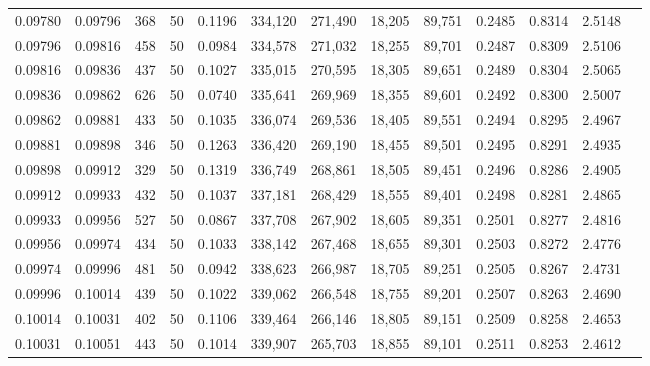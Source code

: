 \begin{tabular}{rrrrrrrrrrrrr}
0.09780 & 0.09796 &   368 &  50 &                                     0.1196 & 334,120 & 271,490 &  18,205 &  89,751 & 0.2485 & 0.8314 & 2.5148 \\
0.09796 & 0.09816 &   458 &  50 &                                     0.0984 & 334,578 & 271,032 &  18,255 &  89,701 & 0.2487 & 0.8309 & 2.5106 \\
0.09816 & 0.09836 &   437 &  50 &                                     0.1027 & 335,015 & 270,595 &  18,305 &  89,651 & 0.2489 & 0.8304 & 2.5065 \\
0.09836 & 0.09862 &   626 &  50 &                                     0.0740 & 335,641 & 269,969 &  18,355 &  89,601 & 0.2492 & 0.8300 & 2.5007 \\
0.09862 & 0.09881 &   433 &  50 &                                     0.1035 & 336,074 & 269,536 &  18,405 &  89,551 & 0.2494 & 0.8295 & 2.4967 \\
0.09881 & 0.09898 &   346 &  50 &                                     0.1263 & 336,420 & 269,190 &  18,455 &  89,501 & 0.2495 & 0.8291 & 2.4935 \\
0.09898 & 0.09912 &   329 &  50 &                                     0.1319 & 336,749 & 268,861 &  18,505 &  89,451 & 0.2496 & 0.8286 & 2.4905 \\
0.09912 & 0.09933 &   432 &  50 &                                     0.1037 & 337,181 & 268,429 &  18,555 &  89,401 & 0.2498 & 0.8281 & 2.4865 \\
0.09933 & 0.09956 &   527 &  50 &                                     0.0867 & 337,708 & 267,902 &  18,605 &  89,351 & 0.2501 & 0.8277 & 2.4816 \\
0.09956 & 0.09974 &   434 &  50 &                                     0.1033 & 338,142 & 267,468 &  18,655 &  89,301 & 0.2503 & 0.8272 & 2.4776 \\
0.09974 & 0.09996 &   481 &  50 &                                     0.0942 & 338,623 & 266,987 &  18,705 &  89,251 & 0.2505 & 0.8267 & 2.4731 \\
0.09996 & 0.10014 &   439 &  50 &                                     0.1022 & 339,062 & 266,548 &  18,755 &  89,201 & 0.2507 & 0.8263 & 2.4690 \\
0.10014 & 0.10031 &   402 &  50 &                                     0.1106 & 339,464 & 266,146 &  18,805 &  89,151 & 0.2509 & 0.8258 & 2.4653 \\
0.10031 & 0.10051 &   443 &  50 &                                     0.1014 & 339,907 & 265,703 &  18,855 &  89,101 & 0.2511 & 0.8253 & 2.4612 \\

\end{tabular}
